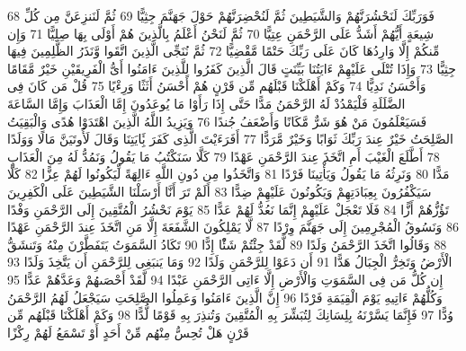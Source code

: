 \documentclass[20pt,a4paper]{article}
\begin{document}
{\tiny\colorbox{cl_aya}{68}} فَوَرَبِّكَ لَنَحْشُرَنَّهُمْ وَالشَّيَطِينَ ثُمَّ لَنُحْضِرَنَّهُمْ حَوْلَ جَهَنَّمَ جِثِيًّا
{\tiny\colorbox{cl_aya}{69}} ثُمَّ لَنَنزِعَنَّ مِن كُلِّ شِيعَةٍ أَيُّهُمْ أَشَدُّ عَلَى الرَّحْمَنِ عِتِيًّا
{\tiny\colorbox{cl_aya}{70}} ثُمَّ لَنَحْنُ أَعْلَمُ بِالَّذِينَ هُمْ أَوْلَى بِهَا صِلِيًّا
{\tiny\colorbox{cl_aya}{71}} وَإِن مِّنكُمْ إِلَّا وَارِدُهَا كَانَ عَلَى رَبِّكَ حَتْمًا مَّقْضِيًّا
{\tiny\colorbox{cl_aya}{72}} ثُمَّ نُنَجِّى الَّذِينَ اتَّقَوا وَّنَذَرُ الظَّلِمِينَ فِيهَا جِثِيًّا
{\tiny\colorbox{cl_aya}{73}} وَإِذَا تُتْلَى عَلَيْهِمْ ءَايَتُنَا بَيِّنَتٍ قَالَ الَّذِينَ كَفَرُوا لِلَّذِينَ ءَامَنُوا أَىُّ الْفَرِيقَيْنِ خَيْرٌ مَّقَامًا وَأَحْسَنُ نَدِيًّا
{\tiny\colorbox{cl_aya}{74}} وَكَمْ أَهْلَكْنَا قَبْلَهُم مِّن قَرْنٍ هُمْ أَحْسَنُ أَثَثًا وَرِءْيًا
{\tiny\colorbox{cl_aya}{75}} قُلْ مَن كَانَ فِى الضَّلَلَةِ فَلْيَمْدُدْ لَهُ الرَّحْمَنُ مَدًّا حَتَّى إِذَا رَأَوْا مَا يُوعَدُونَ إِمَّا الْعَذَابَ وَإِمَّا السَّاعَةَ فَسَيَعْلَمُونَ مَنْ هُوَ شَرٌّ مَّكَانًا وَأَضْعَفُ جُندًا
{\tiny\colorbox{cl_aya}{76}} وَيَزِيدُ اللَّهُ الَّذِينَ اهْتَدَوْا هُدًى وَالْبَقِيَتُ الصَّلِحَتُ خَيْرٌ عِندَ رَبِّكَ ثَوَابًا وَخَيْرٌ مَّرَدًّا
{\tiny\colorbox{cl_aya}{77}} أَفَرَءَيْتَ الَّذِى كَفَرَ بَِٔايَتِنَا وَقَالَ لَأُوتَيَنَّ مَالًا وَوَلَدًا
{\tiny\colorbox{cl_aya}{78}} أَطَّلَعَ الْغَيْبَ أَمِ اتَّخَذَ عِندَ الرَّحْمَنِ عَهْدًا
{\tiny\colorbox{cl_aya}{79}} كَلَّا سَنَكْتُبُ مَا يَقُولُ وَنَمُدُّ لَهُ مِنَ الْعَذَابِ مَدًّا
{\tiny\colorbox{cl_aya}{80}} وَنَرِثُهُ مَا يَقُولُ وَيَأْتِينَا فَرْدًا
{\tiny\colorbox{cl_aya}{81}} وَاتَّخَذُوا مِن دُونِ اللَّهِ ءَالِهَةً لِّيَكُونُوا لَهُمْ عِزًّا
{\tiny\colorbox{cl_aya}{82}} كَلَّا سَيَكْفُرُونَ بِعِبَادَتِهِمْ وَيَكُونُونَ عَلَيْهِمْ ضِدًّا
{\tiny\colorbox{cl_aya}{83}} أَلَمْ تَرَ أَنَّا أَرْسَلْنَا الشَّيَطِينَ عَلَى الْكَفِرِينَ تَؤُزُّهُمْ أَزًّا
{\tiny\colorbox{cl_aya}{84}} فَلَا تَعْجَلْ عَلَيْهِمْ إِنَّمَا نَعُدُّ لَهُمْ عَدًّا
{\tiny\colorbox{cl_aya}{85}} يَوْمَ نَحْشُرُ الْمُتَّقِينَ إِلَى الرَّحْمَنِ وَفْدًا
{\tiny\colorbox{cl_aya}{86}} وَنَسُوقُ الْمُجْرِمِينَ إِلَى جَهَنَّمَ وِرْدًا
{\tiny\colorbox{cl_aya}{87}} لَّا يَمْلِكُونَ الشَّفَعَةَ إِلَّا مَنِ اتَّخَذَ عِندَ الرَّحْمَنِ عَهْدًا
{\tiny\colorbox{cl_aya}{88}} وَقَالُوا اتَّخَذَ الرَّحْمَنُ وَلَدًا
{\tiny\colorbox{cl_aya}{89}} لَّقَدْ جِئْتُمْ شَئًْا إِدًّا
{\tiny\colorbox{cl_aya}{90}} تَكَادُ السَّمَوَتُ يَتَفَطَّرْنَ مِنْهُ وَتَنشَقُّ الْأَرْضُ وَتَخِرُّ الْجِبَالُ هَدًّا
{\tiny\colorbox{cl_aya}{91}} أَن دَعَوْا لِلرَّحْمَنِ وَلَدًا
{\tiny\colorbox{cl_aya}{92}} وَمَا يَنبَغِى لِلرَّحْمَنِ أَن يَتَّخِذَ وَلَدًا
{\tiny\colorbox{cl_aya}{93}} إِن كُلُّ مَن فِى السَّمَوَتِ وَالْأَرْضِ إِلَّا ءَاتِى الرَّحْمَنِ عَبْدًا
{\tiny\colorbox{cl_aya}{94}} لَّقَدْ أَحْصَىهُمْ وَعَدَّهُمْ عَدًّا
{\tiny\colorbox{cl_aya}{95}} وَكُلُّهُمْ ءَاتِيهِ يَوْمَ الْقِيَمَةِ فَرْدًا
{\tiny\colorbox{cl_aya}{96}} إِنَّ الَّذِينَ ءَامَنُوا وَعَمِلُوا الصَّلِحَتِ سَيَجْعَلُ لَهُمُ الرَّحْمَنُ وُدًّا
{\tiny\colorbox{cl_aya}{97}} فَإِنَّمَا يَسَّرْنَهُ بِلِسَانِكَ لِتُبَشِّرَ بِهِ الْمُتَّقِينَ وَتُنذِرَ بِهِ قَوْمًا لُّدًّا
{\tiny\colorbox{cl_aya}{98}} وَكَمْ أَهْلَكْنَا قَبْلَهُم مِّن قَرْنٍ هَلْ تُحِسُّ مِنْهُم مِّنْ أَحَدٍ أَوْ تَسْمَعُ لَهُمْ رِكْزًا
\end{document}
